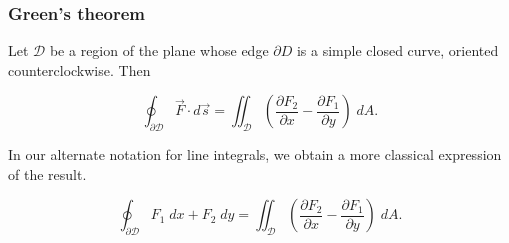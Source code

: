\documentclass[11pt,ignorenonframetext,aspectratio=169,xcolor={svgnames}]{beamer}
\begin{document}
\begin{frame}\frametitle{Green's theorem}

Let $\mathcal{D}$ be a region of the plane whose edge $\partial D$ is a
simple closed curve, oriented counterclockwise. Then

\[ \oint_{\mathcal{\partial D}} \vec{F} \cdot d\vec{s} = \iint_{\mathcal{D}} \left( \frac{\partial F_2}{\partial x} - \frac{\partial F_1}{\partial y} \right) \; dA.\]

In our alternate notation for line integrals, we obtain a more classical
expression of the result.

\[ \oint_{\mathcal{\partial D}} F_1 \; dx + F_2 \; dy = \iint_{\mathcal{D}} \left( \frac{\partial F_2}{\partial x} - \frac{\partial F_1}{\partial y} \right) \; dA.\]

\end{frame}
\end{document}
